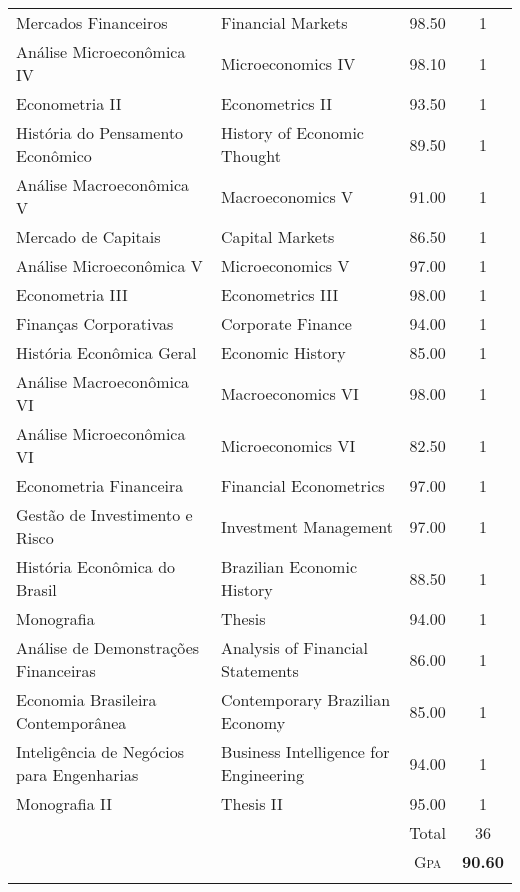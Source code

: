 \begin{center}
\begin{supertabular}{p{4.5cm} p{4.5cm} c c}
Mercados Financeiros & Financial Markets & 98.50 & 1 \\
Análise Microeconômica IV & Microeconomics IV & 98.10 & 1\\
Econometria II & Econometrics II & 93.50 & 1 \\
História do Pensamento Econômico & History of Economic Thought & 89.50 & 1 \\
Análise Macroeconômica V & Macroeconomics V & 91.00 & 1 \\
Mercado de Capitais & Capital Markets & 86.50 & 1 \\
Análise Microeconômica V & Microeconomics V & 97.00 & 1 \\
Econometria III & Econometrics III & 98.00 & 1 \\
Finanças Corporativas & Corporate Finance & 94.00 & 1 \\
História Econômica Geral & Economic History & 85.00 & 1 \\
Análise Macroeconômica VI & Macroeconomics VI & 98.00 & 1 \\
Análise Microeconômica VI & Microeconomics VI & 82.50 & 1 \\
Econometria Financeira & Financial Econometrics &  97.00 & 1 \\
Gestão de Investimento e Risco & Investment Management & 97.00 & 1 \\
História Econômica do Brasil & Brazilian Economic History &  88.50 & 1 \\
Monografia & Thesis & 94.00 & 1 \\
Análise de Demonstrações Financeiras & Analysis of Financial Statements & 86.00 & 1 \\
Economia Brasileira Contemporânea & Contemporary Brazilian Economy & 85.00 & 1 \\
Inteligência de Negócios para Engenharias & Business Intelligence for Engineering & 94.00 & 1 \\
Monografia II & Thesis II & 95.00 & 1 \\
& & Total&36\\
& &\textsc{Gpa}&\textbf{90.60} \\ \\ 
\end{supertabular}
\end{center}
